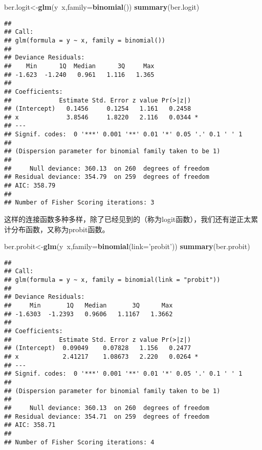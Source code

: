\documentclass[]{ctexart}
\newenvironment{Shaded}{\begin{snugshade}}{\end{snugshade}}
\newcommand{\KeywordTok}[1]{\textcolor[rgb]{0.13,0.29,0.53}{\textbf{{#1}}}}
\newcommand{\DataTypeTok}[1]{\textcolor[rgb]{0.13,0.29,0.53}{{#1}}}
\newcommand{\StringTok}[1]{\textcolor[rgb]{0.31,0.60,0.02}{{#1}}}
\newcommand{\NormalTok}[1]{{#1}}
\begin{document}
\begin{Shaded}
\begin{Highlighting}[]
\NormalTok{ber.logit<-}\KeywordTok{glm}\NormalTok{(y~x,}\DataTypeTok{family=}\KeywordTok{binomial}\NormalTok{())}
\KeywordTok{summary}\NormalTok{(ber.logit)}
\end{Highlighting}
\end{Shaded}

\begin{verbatim}
## 
## Call:
## glm(formula = y ~ x, family = binomial())
## 
## Deviance Residuals: 
##    Min      1Q  Median      3Q     Max  
## -1.623  -1.240   0.961   1.116   1.365  
## 
## Coefficients:
##             Estimate Std. Error z value Pr(>|z|)  
## (Intercept)   0.1456     0.1254   1.161   0.2458  
## x             3.8546     1.8220   2.116   0.0344 *
## ---
## Signif. codes:  0 '***' 0.001 '**' 0.01 '*' 0.05 '.' 0.1 ' ' 1
## 
## (Dispersion parameter for binomial family taken to be 1)
## 
##     Null deviance: 360.13  on 260  degrees of freedom
## Residual deviance: 354.79  on 259  degrees of freedom
## AIC: 358.79
## 
## Number of Fisher Scoring iterations: 3
\end{verbatim}

这样的连接函数多种多样，除了已经见到的（称为logit函数），我们还有逆正太累计分布函数，又称为probit函数。

\begin{Shaded}
\begin{Highlighting}[]
\NormalTok{ber.probit<-}\KeywordTok{glm}\NormalTok{(y~x,}\DataTypeTok{family=}\KeywordTok{binomial}\NormalTok{(}\DataTypeTok{link=}\StringTok{'probit'}\NormalTok{))}
\KeywordTok{summary}\NormalTok{(ber.probit)}
\end{Highlighting}
\end{Shaded}

\begin{verbatim}
## 
## Call:
## glm(formula = y ~ x, family = binomial(link = "probit"))
## 
## Deviance Residuals: 
##     Min       1Q   Median       3Q      Max  
## -1.6303  -1.2393   0.9606   1.1167   1.3662  
## 
## Coefficients:
##             Estimate Std. Error z value Pr(>|z|)  
## (Intercept)  0.09049    0.07828   1.156   0.2477  
## x            2.41217    1.08673   2.220   0.0264 *
## ---
## Signif. codes:  0 '***' 0.001 '**' 0.01 '*' 0.05 '.' 0.1 ' ' 1
## 
## (Dispersion parameter for binomial family taken to be 1)
## 
##     Null deviance: 360.13  on 260  degrees of freedom
## Residual deviance: 354.71  on 259  degrees of freedom
## AIC: 358.71
## 
## Number of Fisher Scoring iterations: 4
\end{verbatim}
\end{document}
